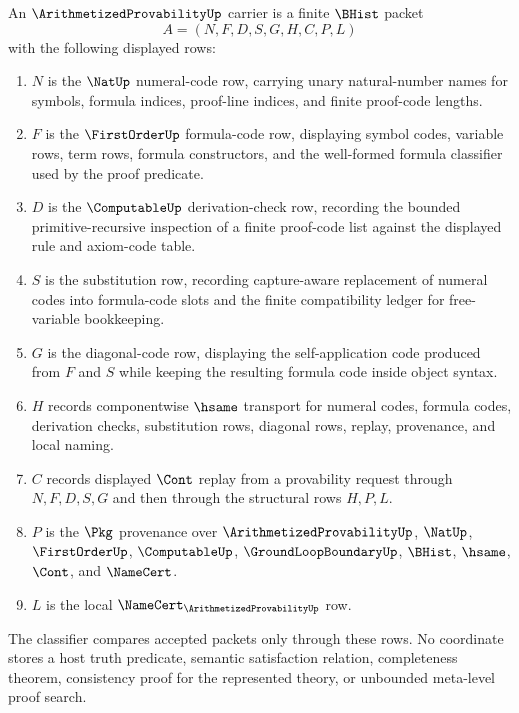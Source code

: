 \begin{definition}
\label{def:arithmetized-provability-carrier}
An $\ArithmetizedProvabilityUp$ carrier is a finite $\BHist$ packet
$$
A=(N,F,D,S,G,H,C,P,L)
$$
with the following displayed rows:
\begin{enumerate}
\item $N$ is the $\NatUp$ numeral-code row, carrying unary natural-number names for symbols, formula indices, proof-line indices, and finite proof-code lengths.
\item $F$ is the $\FirstOrderUp$ formula-code row, displaying symbol codes, variable rows, term rows, formula constructors, and the well-formed formula classifier used by the proof predicate.
\item $D$ is the $\ComputableUp$ derivation-check row, recording the bounded primitive-recursive inspection of a finite proof-code list against the displayed rule and axiom-code table.
\item $S$ is the substitution row, recording capture-aware replacement of numeral codes into formula-code slots and the finite compatibility ledger for free-variable bookkeeping.
\item $G$ is the diagonal-code row, displaying the self-application code produced from $F$ and $S$ while keeping the resulting formula code inside object syntax.
\item $H$ records componentwise $\hsame$ transport for numeral codes, formula codes, derivation checks, substitution rows, diagonal rows, replay, provenance, and local naming.
\item $C$ records displayed $\Cont$ replay from a provability request through $N,F,D,S,G$ and then through the structural rows $H,P,L$.
\item $P$ is the $\Pkg$ provenance over $\ArithmetizedProvabilityUp$, $\NatUp$, $\FirstOrderUp$, $\ComputableUp$, $\GroundLoopBoundaryUp$, $\BHist$, $\hsame$, $\Cont$, and $\NameCert$.
\item $L$ is the local $\NameCert_{\ArithmetizedProvabilityUp}$ row.
\end{enumerate}
The classifier compares accepted packets only through these rows. No coordinate stores a host truth predicate, semantic satisfaction relation, completeness theorem, consistency proof for the represented theory, or unbounded meta-level proof search.
\end{definition}


